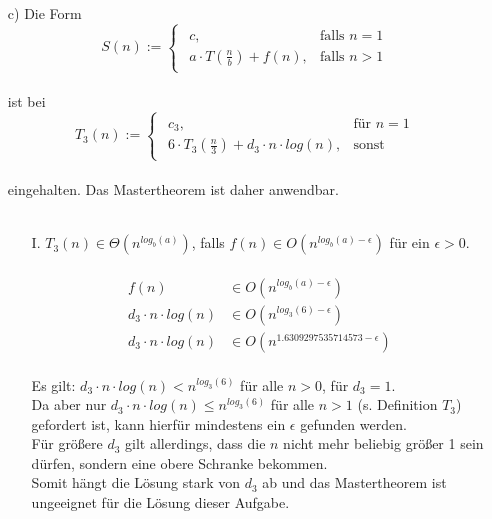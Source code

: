 \documentclass{article}
\begin{document}
\begin{enumerate}
   	\item [c)]
    Die Form\\
    \[
	S(n) :=  \begin{cases}
	    	\begin{array}{ll}
    			c, & \text{falls }n=1\\
				a \cdot T(\frac{n}{b})+f(n), &\text{falls }n>1
			\end{array}
		\end{cases}
   	\]
   	\\
   	ist bei\\
   	\[
	T_3(n) := \begin{cases}
				\begin{array}{ll}
					c_3,			& \text{für }n=1\\
					6 \cdot T_3(\frac{n}{3})+d_3\cdot n\cdot log(n), & \text{sonst}
				\end{array}
			\end{cases}
   	\]
   	\\
   	eingehalten. Das Mastertheorem ist daher anwendbar.\\
   	\\
   	\begin{enumerate}
   	    \item[I.]
   	    $T_3(n) \in \Theta (n^{log_b(a)})$, falls $f(n) \in O(n^{log_b(a)- \epsilon})$ für ein $\epsilon > 0$.\\
   	    \\
   	    \[
   	        \begin{array}{ll}
   	            f(n) &\in O(n^{log_b(a)- \epsilon})\\
   	            d_3\cdot n\cdot log(n) &\in O(n^{log_3(6)- \epsilon})\\
   	            d_3\cdot n\cdot log(n) &\in O(n^{1.6309297535714573- \epsilon})
   	        \end{array}
   	    \]
   	    \\
   	    Es gilt: $d_3\cdot n\cdot log(n) < n^{log_3(6)}$ für alle $n > 0$, für $d_3 = 1$.\\
   	    Da aber nur $d_3\cdot n\cdot log(n) \leq n^{log_3(6)}$ für alle $n > 1$ (s. Definition $T_3$) gefordert ist, kann hierfür mindestens ein $\epsilon$ gefunden werden.\\
   	    Für größere $d_3$ gilt allerdings, dass die $n$ nicht mehr beliebig größer 1 sein dürfen, sondern eine obere Schranke bekommen.\\
   	    Somit hängt die Lösung stark von $d_3$ ab und das Mastertheorem ist ungeeignet für die Lösung dieser Aufgabe.
   	\end{enumerate}
\end{enumerate}
\end{document}
